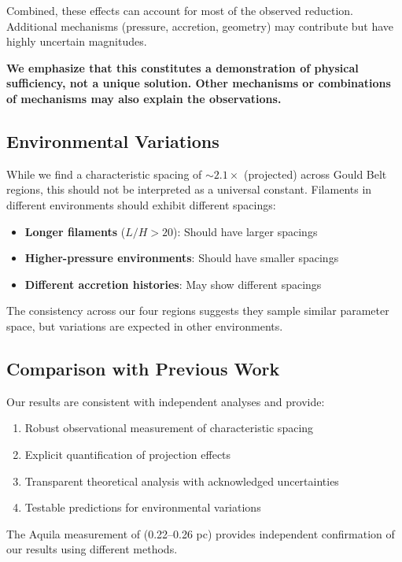 \documentclass[11pt,a4paper]{article}
\begin{document}
Combined, these effects can account for most of the observed reduction. Additional mechanisms (pressure, accretion, geometry) may contribute but have highly uncertain magnitudes.

\textbf{We emphasize that this constitutes a demonstration of physical sufficiency, not a unique solution. Other mechanisms or combinations of mechanisms may also explain the observations.}

\subsection{Environmental Variations}

While we find a characteristic spacing of $\sim2.1\times$ (projected) across Gould Belt regions, this should not be interpreted as a universal constant. Filaments in different environments should exhibit different spacings:

\begin{itemize}
    \item \textbf{Longer filaments} ($L/H > 20$): Should have larger spacings
    \item \textbf{Higher-pressure environments}: Should have smaller spacings
    \item \textbf{Different accretion histories}: May show different spacings
\end{itemize}

The consistency across our four regions suggests they sample similar parameter space, but variations are expected in other environments.

\subsection{Comparison with Previous Work}

Our results are consistent with independent analyses and provide:
\begin{enumerate}
    \item Robust observational measurement of characteristic spacing
    \item Explicit quantification of projection effects
    \item Transparent theoretical analysis with acknowledged uncertainties
    \item Testable predictions for environmental variations
\end{enumerate}

The Aquila measurement of \citet{Arzoumanian2019} (0.22--0.26 pc) provides independent confirmation of our results using different methods.
\end{document}
